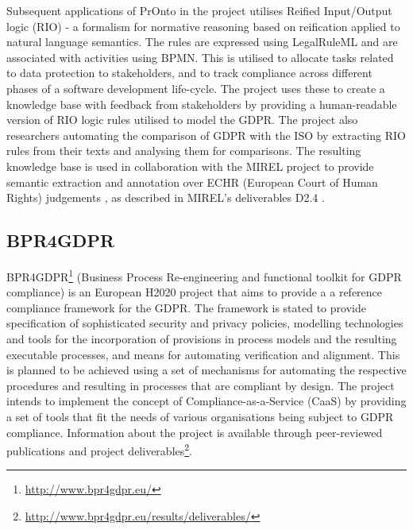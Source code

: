 Subsequent applications of PrOnto in the project utilises Reified Input/Output logic (RIO) \cite{robaldo_reified_2017} - a formalism for normative reasoning based on reification applied to natural language semantics. The rules are expressed using LegalRuleML and are associated with activities using BPMN. This is utilised to allocate tasks related to data protection to stakeholders, and to track compliance across different phases of a software development life-cycle.
The project uses these to create a knowledge base \cite{bartolini_agile_2019} with feedback from stakeholders by providing a human-readable version of RIO logic rules utilised to model the GDPR. 
The project also researchers automating the comparison of GDPR with the ISO by extracting RIO rules from their texts and analysing them for comparisons.
The resulting knowledge base is used in collaboration with the MIREL project to provide semantic extraction and annotation over ECHR (European Court of Human Rights) judgements \cite{cardellino_legal_2017}, as described in MIREL's deliverables D2.4 \cite{robaldo_livio_d2.4_2017}.

\subsection*{BPR4GDPR}\label{sec:sota:BPR4GDPR}
BPR4GDPR\footnote{\url{http://www.bpr4gdpr.eu/}} (Business Process Re-engineering and functional toolkit for GDPR compliance) is an European H2020 project that aims to provide a a reference compliance framework for the GDPR. The framework is stated to provide specification of sophisticated security and privacy policies, modelling technologies and tools for the incorporation of provisions in process models and the resulting executable processes, and means for automating verification and alignment.
This is planned to be achieved using a set of mechanisms for automating the respective procedures and resulting in processes that are compliant by design.
The project intends to implement the concept of Compliance-as-a-Service (CaaS) by providing a set of tools that fit the needs of various organisations being subject to GDPR compliance.
Information about the project is available through peer-reviewed publications and project deliverables\footnote{\url{http://www.bpr4gdpr.eu/results/deliverables/}}.

